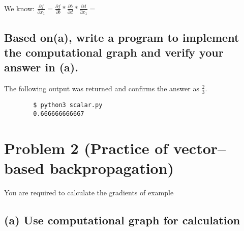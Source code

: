 \documentclass{assignment}
\begin{document}
\begin{multline}
    
\end{multline}
We know: $\frac{\partial f}{\partial x_1} = \frac{\partial f}{\partial b}*\frac{\partial b}{\partial d}*\frac{\partial d}{\partial x_1} =$

\subsection{Based on(a), write a program to implement the computational graph and verify your answer in (a).}

\begin{multicols}{2}
    
    \columnbreak
    \vspace*{\fill}
        The following output was returned and confirms the answer as $\frac{2}{3}$.
        \begin{verbatim}
        $ python3 scalar.py
        0.666666666667
        \end{verbatim}
    \vspace*{\fill}
\end{multicols}

\section*{Problem 2 (Practice of vector--based backpropagation)}
\small You are required to calculate the gradients of
 example

\subsection{(a) Use computational graph for calculation}
\end{document}
